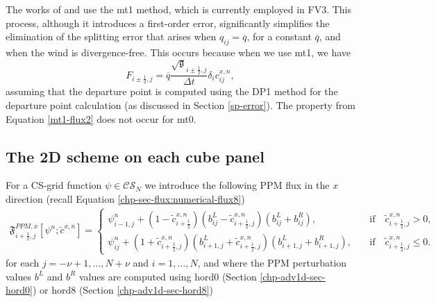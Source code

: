 The works of \citet{lin:2004} and \citet{putman:2007} use the mt1 method, which is currently employed in FV3.
This process, although it introduces a first-order error, 
significantly simplifies the elimination of the splitting error that arises when $q_{ij} = \overline{q}$, for a constant $\overline{q}$, 
and when the wind is divergence-free.
This occurs because when we use mt1, we have
\begin{equation}
	\label{mt1-flux2}
	{F}_{i\pm\frac{1}{2},j} =  \overline{q}\frac{\sqrt{\mathfrak{g}}_{i\pm\frac{1}{2},j}}{\Delta t}
	\delta_i c^{x,n}_{ij},
\end{equation}
assuming that the departure point is computed using the DP1 method for the departure point calculation (as discussed in Section \ref{sp-error}).
The property from Equation \eqref{mt1-flux2} does not occur for mt0.

\subsection{The 2D scheme on each cube panel}
\label{sec-splittingcs}
For a CS-grid function $\psi \in \mathcal{CS}_N$
we introduce the following PPM flux in the $x$ direction (recall Equation \eqref{chp-sec-flux:numerical-flux8})
\begin{align}
	\label{chp5-flux-xdir}
	\mathfrak{F}_{i+\frac{1}{2},j}^{PPM,x} [{{\psi}^n;\tilde{c}^{x,n}}]= %
	\begin{cases}
		{\psi}_{i-1,j}^{n}+(1-\tilde{c}_{i+\frac{1}{2}}^{x,n})
		(b^L_{ij}-\tilde{c}_{i+\frac{1}{2},j}^{x,n})
		(b^L_{ij}+b^R_{ij}),
		\quad &\text{if} \quad \tilde{c}_{i+\frac{1}{2},j}^{x,n}>0,\\
		{\psi}_{ij}^{n}+(1+\tilde{c}_{i+\frac{1}{2},j}^{x,n})
		(b^L_{i+1,j}+\tilde{c}_{i+\frac{1}{2},j}^{x,n})
		(b^L_{i+1,j}+b^R_{i+1,j}),
		\quad &\text{if} \quad \tilde{c}_{i+\frac{1}{2},j}^{x,n}\leq0.
	\end{cases}
\end{align}
for each $j=-\nu+1, \ldots, N+\nu$ and $i=1, \ldots, N$, and
where the PPM perturbation values $b^L$ and $b^R$ values are computed using hord0 (Section \ref{chp-adv1d-sec-hord0}) or hord8 (Section \ref{chp-adv1d-sec-hord8})

